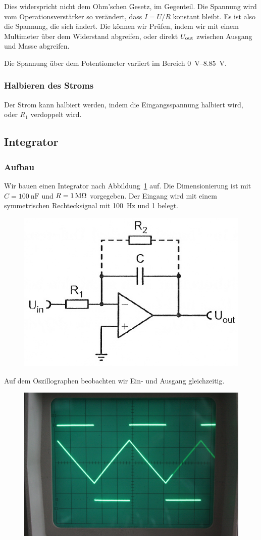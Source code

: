 Dies widerspricht nicht dem Ohm'schen Gesetz, im Gegenteil. Die Spannung wird
vom Operationsverstärker so verändert, dass $I = U/R$ konstant bleibt. Es ist
also die Spannung, die sich ändert. Die können wir Prüfen, indem wir mit einem
Multimeter über dem Widerstand abgreifen, oder direkt $U_\text{out}$ zwischen Ausgang
und Masse abgreifen.

Die Spannung über dem Potentiometer variiert im Bereich
\SIrange{0}{8.85}{\volt}.

\subsubsection{Halbieren des Stroms}

Der Strom kann halbiert werden, indem die Eingangsspannung halbiert wird, oder
$R_1$ verdoppelt wird.

\FloatBarrier
\subsection{Integrator}

\subsubsection{Aufbau}

Wir bauen einen Integrator nach Abbildung~\ref{fig:5_6-11} auf. Die
Dimensionierung ist mit $C = \SI{100}{\nano\farad}$ und $R = \SI1{\mega\ohm}$
vorgegeben. Der Eingang wird mit einem symmetrischen Rechtecksignal mit
\SI{100}{\hertz} und \SI{1}{\voltss} belegt.

\begin{figure}[htbp]
	\centering
	\includegraphics[width=.5\linewidth]{Anleitung/5_6-11.png}
	\caption{%
		\cite[Abbildung~5/6.11]{physik313-Anleitung}
	}
	\label{fig:5_6-11}
\end{figure}

Auf dem Oszillographen beobachten wir Ein- und Ausgang gleichzeitig.

\begin{figure}[htbp]
	\centering
	\includegraphics[width=.45\linewidth]{Oszi_Foto/5-813.jpg}
	\caption{%
	}
	\label{fig:813}
\end{figure}


